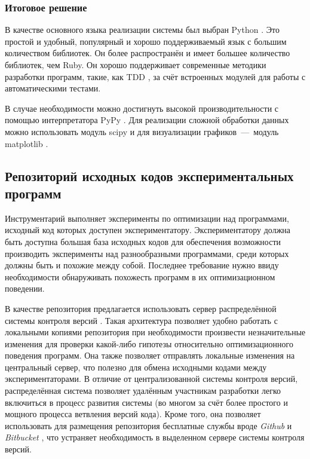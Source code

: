 \subsubsection{Итоговое решение}
В качестве основного языка реализации системы был выбран Python \cite{python}. Это простой и удобный, популярный и хорошо поддерживаемый язык с большим количеством библиотек. Он более распространён \cite{langpop} и имеет большее количество библиотек, чем Ruby. Он хорошо поддерживает современные методики разработки программ, такие, как TDD \cite{tdd}, за счёт встроенных модулей для работы с автоматическими тестами.

В случае необходимости можно достигнуть высокой производительности с помощью интерпретатора PyPy \cite{pypy}. Для реализации сложной обработки данных можно использовать модуль scipy \cite{scipy} и для визуализации \mbox{графиков --- модуль} matplotlib \cite{matplotlib}.


\subsection{Репозиторий исходных кодов экспериментальных программ}
Инструментарий выполняет эксперименты по оптимизации над программами, исходный код которых доступен экспериментатору. Экспериментатору должна быть доступна большая база исходных кодов для обеспечения возможности производить эксперименты над разнообразными программами, среди которых должны быть и похожие между собой. Последнее требование нужно ввиду необходимости обнаруживать похожесть программ в их оптимизационном поведении.

В качестве репозитория предлагается использовать сервер распределённой системы контроля версий \cite{distributed-vcs}. Такая архитектура позволяет удобно работать с локальными копиями репозитория при необходимости произвести незначительные изменения для проверки какой-либо гипотезы относительно оптимизационного поведения программ. Она также позволяет отправлять локальные изменения на центральный сервер, что полезно для обмена исходными кодами между экспериментаторами. В отличие от централизованной системы контроля версий, распределённая система позволяет удалённым участникам разработки легко включиться в процесс развития системы (во многом за счёт более простого и мощного процесса ветвления версий кода). Кроме того, она позволяет использовать для размещения репозитория бесплатные службы вроде \textit{Github} \cite{github} и \textit{Bitbucket} \cite{bitbucket}, что устраняет необходимость в выделенном сервере системы контроля версий.

